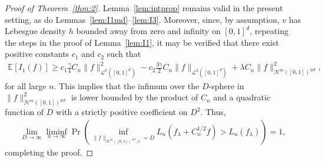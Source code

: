 \documentclass[11pt]{article}
\theoremstyle{definition}
\theoremstyle{remark}
\begin{document}
\begin{proof}[Proof of Theorem~\ref{thm:2}]
Lemma~\ref{lem:intprop} remains valid in the present setting, as do Lemmas~\ref{lem:I1md}--\ref{lem:I3}. Moreover, since, by assumption, $v$ has Lebesgue density $h$ bounded away from zero and infinity on $[0,1]^d$, repeating the steps in the proof of Lemma~\ref{lem:I1}, it may be verified that there exist positive constants $c_1$ and $c_2$ such that 
\begin{align*}
\mathbb{E}[I_1(f)] \geq c_1\frac{\gamma}{4} C_n \|f\|_{\mathcal{L}^2([0,1]^d)}^2 - c_2\frac{3\gamma}{2} C_n \|f\|_{\mathcal{L}^2([0,1]^d)} + \lambda C_n \|f\|_{\mathcal{H}^m([0,1])^{\otimes d}}^2,
\end{align*}
for all large $n$. This implies that the infimum over the $D$-sphere in $\|f\|_{\mathcal{H}^m([0,1])^{\otimes d}}^2$ is lower bounded by the product of $C_n$ and a quadratic function of $D$ with a strictly positive coefficient on $D^2$. Thus,
\begin{align*}
\lim_{D \to \infty} \liminf_{n \to \infty} \Pr\left(\inf_{\| f\|_{\mathcal{H}^m([0,1])^{\otimes d}, \lambda}=D} L_n(f_{\lambda}+C_n^{1/2}f)> L_n(f_\lambda) \right) = 1,
\end{align*}
completing the proof.

\end{proof}
\end{document}
